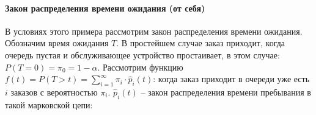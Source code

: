 \paragraph{Закон распределения времени ожидания (от себя)}
В условиях этого примера рассмотрим закон распределения времени ожидания.
Обозначим время ожидания $T$. В простейшем случае заказ приходит, когда
очередь пустая и обслуживающее устройство простаивает, в этом случае:
$P(T = 0) = \pi_0 = 1-\alpha$. Рассмотрим функцию
$f(t) = P(T > t) = \sum_{i=1}^\infty \pi_i \cdot \hat{p}_i (t)$:
когда заказ приходит в очереди уже есть $i$ заказов с вероятностью $\pi_i$.
$\hat{p}_i(t)$ -- %
закон распределения времени пребывания в такой марковской цепи: 
\begin{figure}[h!]
  \centering
\end{figure}

